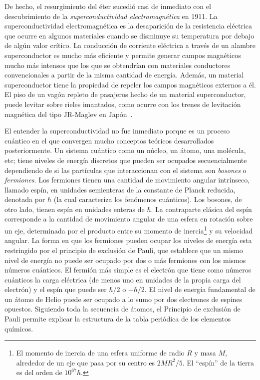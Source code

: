 De hecho, el resurgimiento del éter sucedió casi de inmediato con el descubrimiento de la \emph{superconductividad electromagnética} en 1911. La superconductividad electromagnética es la desaparición de la resistencia eléctrica que ocurre en algunos materiales cuando se disminuye su temperatura por debajo de algún valor crítico. La conducción de corriente eléctrica a través de un alambre superconductor es mucho más eficiente y permite generar campos magnéticos mucho más intensos que los que se obtendrían con materiales conductores convencionales a partir de  la misma cantidad de energía. Además, un material superconductor tiene la propiedad de repeler los campos magnéticos externos a él. El piso de un vagón repleto de pasajeros hecho de un material superconductor, puede levitar sobre rieles imantados, como ocurre con los trenes de levitación magnética del tipo JR-Maglev en Japón~\cite{maglev}. 

El entender la superconductividad no fue inmediato porque es un proceso cuántico en el que convergen mucho conceptos teóricos desarrollados posteriormente. Un sistema cuántico como un núcleo, un átomo, una molécula, etc; tiene niveles de energía discretos que pueden ser ocupados secuencialmente dependiendo de si las partículas que interaccionan con el sistema son \emph{bosones} o \emph{fermiones}.  Los fermiones tienen una cantidad de movimiento angular intrínseco, llamado espín, en unidades semienteras de la constante de Planck reducida, denotada por $\hbar$ (la cual caracteriza los fenómenos cuánticos). Los bosones, de otro lado, tienen espín en unidades enteras de $\hbar$. La contraparte clásica del espín corresponde a la cantidad de movimiento angular de una esfera en rotación sobre un eje, determinada por el producto entre su momento de inercia\footnote{El momento de inercia de una esfera uniforme de radio $R$ y masa $M$, alrededor de un eje que pasa por su centro es $2MR^2/5$. El ``espín'' de la tierra es del orden de $10^{67}\hbar$.} y su velocidad angular. La forma en que los fermiones pueden ocupar los niveles de energía esta restringido por el principio de exclusión de Pauli, que establece que un mismo nivel de energía no puede ser ocupado por dos o más fermiones con los mismos números cuánticos. El fermión más simple es el electrón que tiene como números cuánticos la carga eléctrica (de menos uno en unidades de la propia carga del electrón) y el espín que puede ser $\hbar/2$ o $-\hbar/2$. El nivel de energía fundamental de un átomo de Helio puede ser ocupado a lo sumo por dos electrones de espines opuestos. Siguiendo toda la secuencia de átomos,  el Principio de exclusión de Pauli permite explicar la estructura de la tabla periódica de los elementos químicos. 

